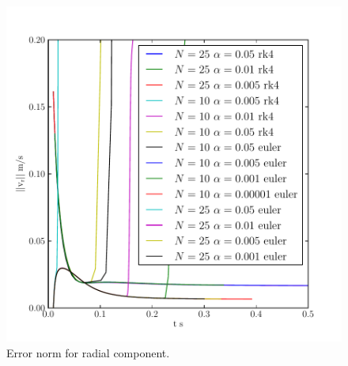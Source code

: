 \begin{figure}
\begin{center}
\includegraphics{fixed/normr.pdf}
\end{center}
\caption{Error norm for radial component.
}
\label{fix:normr}
\end{figure}


